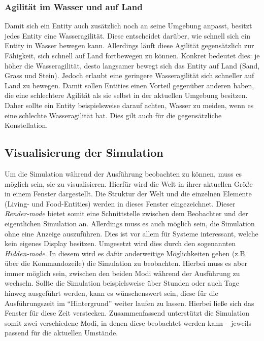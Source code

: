 \documentclass[course=erap]{aspdoc}
\begin{document}
\subsubsection{Agilität im Wasser und auf Land}
Damit sich ein Entity auch zusätzlich noch an seine Umgebung anpasst, besitzt jedes Entity eine Wasseragilität. Diese entscheidet darüber, wie schnell sich ein Entity in Wasser bewegen kann. Allerdings läuft diese Agilität gegensätzlich zur Fähigkeit, sich schnell auf Land fortbewegen zu können. Konkret bedeutet dies: je höher die Wasseragilität, desto langsamer bewegt sich das Entity auf Land (Sand, Grass und Stein). Jedoch erlaubt eine geringere Wasseragilität sich schneller auf Land zu bewegen. Damit sollen Entities einen Vorteil gegenüber anderen haben, die eine schlechtere Agilität als sie selbst in der aktuellen Umgebung besitzen. Daher sollte ein Entity beispielsweise darauf achten, Wasser zu meiden, wenn es eine schlechte Wasseragilität hat. Dies gilt auch für die gegensätzliche Konstellation.


\subsection{Visualisierung der Simulation}
\label{subsec:visualisierung-simulation}
Um die Simulation während der Ausführung beobachten zu können, muss es möglich sein, sie zu visualisieren. Hierfür wird die Welt in ihrer aktuellen Größe in einem Fenster dargestellt. Die Struktur der Welt und die einzelnen Elemente (Living- und Food-Entities) werden in dieses Fenster eingezeichnet. Dieser \emph{Render-mode} bietet somit eine Schnittstelle zwischen dem Beobachter und der eigentlichen Simulation an. Allerdings muss es auch möglich sein, die Simulation ohne eine Anzeige auszuführen. Dies ist vor allem für Systeme interessant, welche kein eigenes Display besitzen. Umgesetzt wird dies durch den sogenannten \emph{Hidden-mode}. In diesem wird es dafür anderweitige Möglichkeiten geben (z.B. über die Kommandozeile) die Simulation zu beobachten. Hierbei muss es aber immer möglich sein, zwischen den beiden Modi während der Ausführung zu wechseln. Sollte die Simulation beispielsweise über Stunden oder auch Tage hinweg ausgeführt werden, kann es wünschenswert sein, diese für die Ausführungszeit im "`Hintergrund"' weiter laufen zu lassen. Hierbei ließe sich das Fenster für diese Zeit verstecken. Zusammenfassend unterstützt die Simulation somit zwei verschiedene Modi, in denen diese beobachtet werden kann -- jeweils passend für die aktuellen Umstände.
\end{document}

